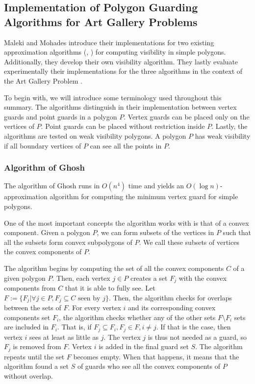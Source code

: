 \subsection[Implementation of Guarding Algorithms]{Implementation of Polygon Guarding Algorithms for Art Gallery Problems}
Maleki and Mohades \cite{maleki2022implementation} introduce their implementations for two existing approximation algorithms (\cite{GHOSH2010718}, \cite{bhattacharya2016approximability}) for computing visibility in simple polygons. Additionally, they develop their own visibility algorithm. They lastly  evaluate experimentally their implementations for the three algorithms in the context of the Art Gallery Problem \cite{o1987art}.

To begin with, we will introduce some terminology used throughout this summary. The algorithms distinguish in their implementation between vertex guards and point guards in  a polygon $P$. Vertex guards can be placed only on the vertices of $P$. Point guards can be placed without restriction inside $P$. Lastly, the algorithms are tested on weak visibility polygons. A polygon $P$ has weak visibility if all boundary vertices of $P$ can see all the points in $P$.


\subsubsection{Algorithm of Ghosh}
The algorithm of Ghosh \cite{GHOSH2010718} runs in $O(n^4)$ time and yields an $O(\log n)$-approximation algorithm for computing the minimum vertex guard for simple polygons. 

One of the most important concepts the algorithm works with is that of a convex component. Given a polygon $P$, we can form subsets of the vertices in $P$ such that all the subsets form convex subpolygons of $P$. We call these subsets of vertices the convex components of $P$.

The algorithm begins by computing the set of all the convex components $C$ of a given polygon $P$. Then, each vertex $j \in P$ creates a set $F_j$ with the convex components from $C$ that it is able to fully see. Let $F := \{F_j | \forall j \in P, F_j \subseteq C \text{ seen by } j\}$. Then, the algorithm checks for overlaps between the sets of $F$. For every vertex $i$ and its corresponding convex components set $F_i$, the algorithm checks whether any of the other sets $F \setminus F_i$ sets are included in $F_i$. That is, if $F_j \subseteq F_i, F_j \in F, i \neq j$. If that is the case, then  vertex $i$ sees at least as little as $j$. The vertex $j$ is thus not needed as a guard, so $F_j$ is removed from $F$. Vertex $i$ is added in the final guard set $S$. The algorithm repeats until the set $F$ becomes empty. When that happens, it means that the algorithm found a set $S$ of guards who see all the convex components of $P$ without overlap.

